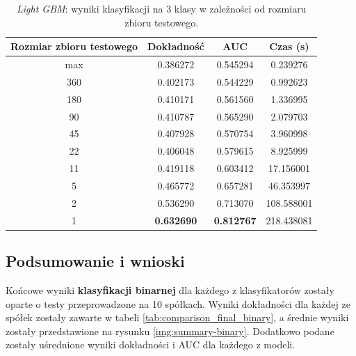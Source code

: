 \documentclass[a4paper, twoside, 11pt, openright]{article}
\begin{document}
\begin{table}[H]
    \centering
    \begin{tabular}{|c|c|c|c|}
    \hline
        \textbf{Rozmiar zbioru testowego} & \textbf{Dokładność} & \textbf{AUC} & \textbf{Czas (s)} \\ \hline
max   						 &  0.386272 &  0.545294 &    0.239276 \\ \hline
360                         &  0.402173 &  0.544229 &    0.992623 \\ \hline
180                         &  0.410171 &  0.561560 &    1.336995 \\ \hline
90                         &  0.410787 &  0.565290 &    2.079703 \\ \hline
45                          &  0.407928 &  0.570754 &    3.960998 \\ \hline
22                          &  0.406048 &  0.579615 &    8.925999 \\ \hline
11                          &  0.419118 &  0.603412 &   17.156001 \\ \hline
5                           &  0.465772 &  0.657281 &   46.353997 \\ \hline
2                           &  0.536290 &  0.713070 &  108.588001 \\ \hline
1                           &  \textbf{0.632690} &  \textbf{0.812767} &  218.438081 \\ \hline
    \end{tabular}
    \caption{\textit{Light GBM}: wyniki klasyfikacji na 3 klasy w zależności od rozmiaru zbioru testowego.}
    \label{tab:lgbm_walk_forward_discrete}
\end{table}

\subsection{Podsumowanie i wnioski}

Końcowe wyniki \textbf{klasyfikacji binarnej} dla każdego z klasyfikatorów zostały oparte o testy przeprowadzone na 10 spółkach. Wyniki dokładności dla każdej ze spółek zostały zawarte w tabeli \ref{tab:comparison_final_binary}, a średnie wyniki zostały przedstawione na rysunku \ref{img:summary-binary}. Dodatkowo podane zostały uśrednione wyniki dokładności i AUC dla każdego z modeli. 
\end{document}
